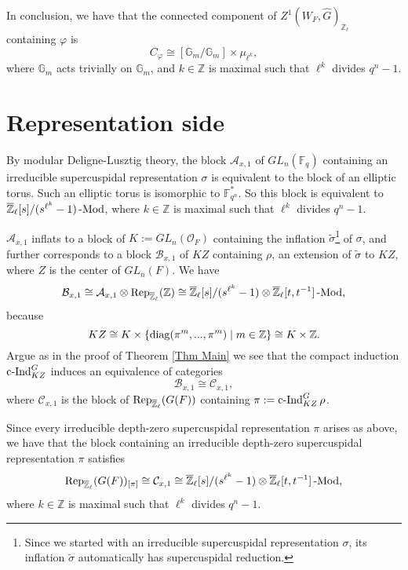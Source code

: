 In conclusion, we have that the connected component of $Z^1(W_F, \hat{G})_{\overline{\mathbb{Z}}_{\ell}}$ containing $\varphi$ is
$$C_{\varphi} \cong [\mathbb{G}_m/\mathbb{G}_m] \times \mu_{\ell^k},$$
where $\mathbb{G}_m$ acts trivially on $\mathbb{G}_m$, and $k \in \mathbb{Z}$ is maximal such that $\ell^k$ divides $q^n-1$.


\section{Representation side}

By modular Deligne-Lusztig theory, the block $\mathcal{A}_{x,1}$ of $GL_n(\mathbb{F}_q)$ containing an irreducible supercuspidal representation $\sigma$ is equivalent to the block of an elliptic torus. Such an elliptic torus is isomorphic to $\mathbb{F}_{q^n}^*$. So this block is equivalent to $\overline{\mathbb{Z}}_{\ell}[s]/(s^{\ell^k}-1)\operatorname{-Mod}$, where $k \in \mathbb{Z}$ is maximal such that $\ell^k$ divides $q^n-1$.

$\mathcal{A}_{x,1}$ inflats to a block of $K:=GL_n(\mathcal{O}_F)$ containing the inflation $\tilde{\sigma}$\footnote{Since we started with an irreducible supercuspidal representation $\sigma$, its inflation $\tilde{\sigma}$ automatically has supercuspidal reduction.} of $\sigma$, and further corresponds to a block $\mathcal{B}_{x,1}$ of $KZ$ containing $\rho$, an extension of $\tilde{\sigma}$ to $KZ$, where $Z$ is the center of $GL_n(F)$. We have
$$\mathcal{B}_{x,1} \cong \mathcal{A}_{x,1} \otimes \operatorname{\operatorname{Rep}}_{\overline{\mathbb{Z}}_{\ell}}(\mathbb{Z}) \cong \overline{\mathbb{Z}}_{\ell}[s]/(s^{\ell^k}-1) \otimes \overline{\mathbb{Z}}_{\ell}[t, t^{-1}]\operatorname{-Mod},$$
because
$$KZ \cong K \times \{\operatorname{\operatorname{diag}}(\pi^m, ..., \pi^m) \;|\; m \in \mathbb{Z}\} \cong K \times \mathbb{Z}.$$
Argue as in the proof of Theorem \ref{Thm Main} we see that the compact induction $\operatorname{\operatorname{c-Ind}}_{KZ}^G$ induces an equivalence of categories
$$\mathcal{B}_{x,1} \cong \mathcal{C}_{x,1},$$
where $\mathcal{C}_{x,1}$ is the block of $\operatorname{\operatorname{Rep}}_{\overline{\mathbb{Z}}_{\ell}}(G(F))$ containing $\pi:=\operatorname{\operatorname{c-Ind}}_{KZ}^G\rho$.

Since every irreducible depth-zero supercuspidal representation $\pi$ arises as above, we have that the block containing an irreducible depth-zero supercuspidal representation $\pi$ satisfies
$$\operatorname{\operatorname{Rep}}_{\overline{\mathbb{Z}}_{\ell}}(G(F))_{[\pi]} \cong \mathcal{C}_{x,1} \cong \overline{\mathbb{Z}}_{\ell}[s]/(s^{\ell^k}-1) \otimes \overline{\mathbb{Z}}_{\ell}[t, t^{-1}]\operatorname{-Mod},$$
where $k \in \mathbb{Z}$ is maximal such that $\ell^k$ divides $q^n-1$.



